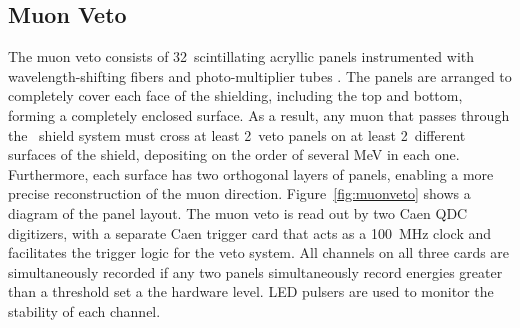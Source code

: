 \documentclass[/main.tex]{subfiles}
\begin{document}
\subsection{Muon Veto}\label{sec:muonveto}
The muon veto consists of 32~scintillating acryllic panels instrumented with wavelength-shifting fibers and photo-multiplier tubes \cite{2015wiseman}.
The panels are arranged to completely cover each face of the shielding, including the top and bottom, forming a completely enclosed surface.
As a result, any muon that passes through the \MJD\ shield system must cross at least 2~veto panels on at least 2~different surfaces of the shield, depositing on the order of several MeV in each one.
Furthermore, each surface has two orthogonal layers of panels, enabling a more precise reconstruction of the muon direction.
Figure~\ref{fig:muonveto} shows a diagram of the panel layout.
The muon veto is read out by two Caen QDC digitizers, with a separate Caen trigger card that acts as a 100~MHz clock and facilitates the trigger logic for the veto system.
All channels on all three cards are simultaneously recorded if any two panels simultaneously record energies greater than a threshold set a the hardware level.
LED pulsers are used to monitor the stability of each channel.
\end{document}
